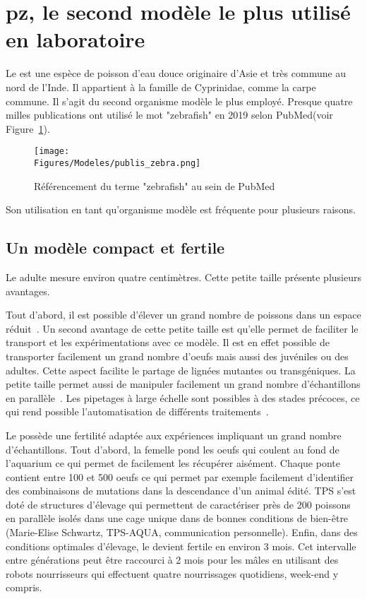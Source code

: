 \documentclass[\main/main.tex]{subfiles}
\begin{document}
            
\section{pz{}, le second modèle le plus utilisé en laboratoire}

%
Le \pz{} est une espèce de poisson d'eau douce originaire d'Asie et très commune au nord de l'Inde.
%
Il appartient à la famille de Cyprinidae, comme la carpe commune.
%
Il s'agit du second organisme modèle le plus employé.
%
Presque quatre milles publications ont utilisé le mot "zebrafish" en 2019
selon PubMed(voir Figure~\ref{fig:model:pz:stats}).

\begin{figure}[htbp]{\textwidth} 
    \centering
       \centering \texttt{[image: \\Figures/Modeles/publis\_zebra.png]}
       \caption{
            \label{fig:model:pz:stats}Référencement du terme "zebrafish" au sein de PubMed
            }
\end{figure}
%
Son utilisation en tant qu'organisme modèle est fréquente pour plusieurs raisons.

    \subsection{Un modèle compact et fertile}
    
%
Le \pz{} adulte mesure environ quatre centimètres.
%
Cette petite taille présente plusieurs avantages.

%
Tout d'abord, il est possible d'élever un grand nombre de poissons dans un espace réduit~\cite{avdesh_2012}.
%
Un second avantage de cette petite taille est qu'elle permet de faciliter le transport et les expérimentations avec ce modèle.
%
Il est en effet possible de transporter facilement un grand nombre d'oeufs mais aussi des juvéniles ou des adultes.
%
Cette aspect facilite le partage de lignées mutantes ou transgéniques.
%
La petite taille permet aussi de manipuler facilement un grand nombre d'échantillons en parallèle~\cite{wittbrodt_2014,brion_2012}. Les pipetages à large échelle sont possibles à des stades précoces,
ce qui rend possible l'automatisation de différents traitements~\cite{mandrell_2012,teixid_2019}.

Le \pz{} possède une fertilité adaptée aux expériences impliquant un grand nombre d'échantillons.
%
Tout d'abord, la femelle pond les oeufs qui coulent au fond de l'aquarium ce  qui permet de facilement les récupérer aisément. Chaque ponte contient entre 100 et 500 oeufs ce qui permet par exemple facilement d'identifier des combinaisons de mutations dans la descendance d'un animal édité. TPS s'est doté de structures d'élevage qui permettent de caractériser près de 200 poissons en parallèle isolés dans une cage unique dans de bonnes conditions de bien-être (Marie-Elise Schwartz, TPS-AQUA, communication personnelle).  
%
Enfin, dans des conditions optimales d'élevage, le \pz{} devient fertile en environ 3 mois. Cet intervalle entre générations peut être raccourci à 2 mois pour les mâles en utilisant des robots nourrisseurs qui effectuent quatre nourrissages quotidiens, week-end y compris. 
\end{document}
